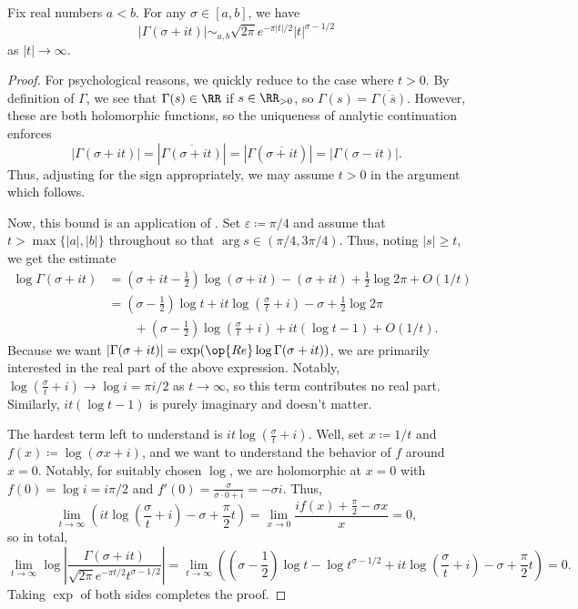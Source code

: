 \documentclass[../notes.tex]{subfiles}
\begin{document}
\begin{corollary}
	Fix real numbers $a<b$. For any $\sigma\in[a,b]$, we have
	\[|\Gamma(\sigma+it)|\sim_{a,b}\sqrt{2\pi}e^{-\pi|t|/2}|t|^{\sigma-1/2}\]
	as $|t|\to\infty$.
\end{corollary}
\begin{proof}
	For psychological reasons, we quickly reduce to the case where $t>0$. By definition of $\Gamma$, we see that $\Gamma(s)\in\RR$ if $s\in\RR_{>0}$, so $\Gamma(s)=\overline{\Gamma(\overline s)}$. However, these are both holomorphic functions, so the uniqueness of analytic continuation enforces
	\[|\Gamma(\sigma+it)|=|\overline{\Gamma(\sigma+it)}|=|\Gamma(\overline{\sigma+it})|=|\Gamma(\sigma-it)|.\]
	Thus, adjusting for the sign appropriately, we may assume $t>0$ in the argument which follows.

	Now, this bound is an application of . Set $\varepsilon\coloneqq\pi/4$ and assume that $t>\max\{|a|,|b|\}$ throughout so that $\arg s\in(\pi/4,3\pi/4)$. Thus, noting $|s|\ge t$, we get the estimate
	\begin{align*}
		\log\Gamma(\sigma+it) &= \left(\sigma+it-\frac12\right)\log(\sigma+it)-(\sigma+it)+\frac12\log2\pi+O(1/t) \\
		&= \left(\sigma-\frac12\right)\log t+it\log\left(\frac\sigma t+i\right)-\sigma+\frac12\log2\pi\\
		&\qquad+\left(\sigma-\frac12\right)\log\left(\frac\sigma t+i\right)+it(\log t-1)+O(1/t).
	\end{align*}
	Because we want $|\Gamma(\sigma+it)|=\exp(\op{Re}\log\Gamma(\sigma+it))$, we are primarily interested in the real part of the above expression. Notably, $\log\left(\frac\sigma t+i\right)\to\log i=\pi i/2$ as $t\to\infty$, so this term contributes no real part. Similarly, $it(\log t-1)$ is purely imaginary and doesn't matter.

	The hardest term left to understand is $it\log\left(\frac\sigma t+i\right)$. Well, set $x\coloneqq1/t$ and $f(x)\coloneqq\log(\sigma x+i)$, and we want to understand the behavior of $f$ around $x=0$. Notably, for suitably chosen $\log$, we are holomorphic at $x=0$ with $f(0)=\log i=i\pi/2$ and $f'(0)=\frac\sigma{\sigma\cdot0+i}=-\sigma i$. Thus,
	\[\lim_{t\to\infty}\left(it\log\left(\frac\sigma t+i\right)-\sigma+\frac\pi2t\right)=\lim_{x\to0}\frac{if(x)+\frac\pi2-\sigma x}{x}=0,\]
	so in total,
	\[\lim_{t\to\infty}\log\left|\frac{\Gamma(\sigma+it)}{\sqrt{2\pi}e^{-\pi t/2}t^{\sigma-1/2}}\right|=\lim_{t\to\infty}\left(\left(\sigma-\frac12\right)\log t-\log t^{\sigma-1/2}+it\log\left(\frac\sigma t+i\right)-\sigma+\frac\pi2t\right)=0.\]
	Taking $\exp$ of both sides completes the proof.
\end{proof}
\end{document}
